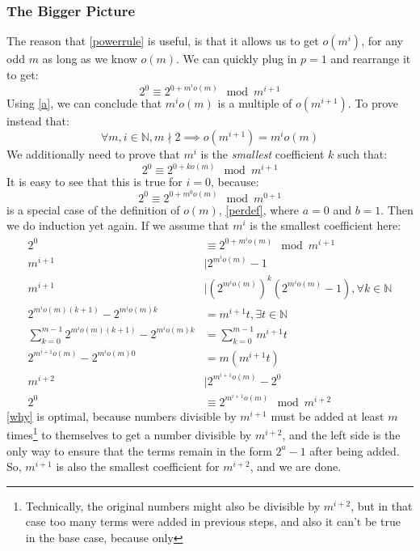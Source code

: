 \documentclass{article}
\begin{document}
  \subsubsection{The Bigger Picture}
  The reason that \eqref{powerrule} is useful, is that it allows us to get $o(m^i)$, for any odd $m$ as long as we know $o(m)$. We can quickly plug in $p = 1$ and rearrange it to get:
  \begin{equation}
    2^0 \equiv 2^{0+m^io(m)} \mod m^{i+1}
  \end{equation}
  Using \eqref{a}, we can conclude that $m^io(m)$ is a multiple of $o(m^{i+1})$. To prove instead that:
  \begin{equation}
    \forall m, i \in \mathbb{N}, m \nmid 2 \implies o(m^{i+1}) = m^io(m) 
  \end{equation}
  We additionally need to prove that $m^i$ is the \emph{smallest} coefficient $k$ such that:
  \begin{equation}
    2^0 \equiv 2^{0 + ko(m)} \mod m^{i+1}
  \end{equation}
  It is easy to see that this is true for $i=0$, because:
  \begin{equation}
    2^0 \equiv 2^{0 + m^0o(m)} \mod m^{0+1}
  \end{equation}
  is a special case of the definition of $o(m)$, \eqref{perdef}, where $a=0$ and $b=1$. Then we do induction yet again. If we assume that $m^i$ is the smallest coefficient here:
  \begin{align}
    2^0 &\equiv 2^{0 + m^io(m)} \mod m^{i+1}\\
    m^{i+1} &\mid 2^{m^io(m)} - 1 \\
    m^{i+1} &\mid (2^{m^io(m)})^k(2^{m^io(m)} - 1), \forall k \in \mathbb{N}\\
    2^{m^io(m)(k+1)} - 2^{m^io(m)k} &=  m^{i+1}t, \exists t \in \mathbb{N}\\
    \sum^{m-1}_{k=0}2^{m^io(m)(k+1)} - 2^{m^io(m)k} &= \sum^{m-1}_{k=0}m^{i+1}t\label{why}\\
    2^{m^{i+1}o(m)} - 2^{m^io(m)0} &= m(m^{i+1}t)\\
    m^{i+2} &\mid 2^{m^{i+1}o(m)} - 2^0\\
    2^0 &\equiv 2^{m^{i+1}o(m)} \mod m^{i+2}
  \end{align}
  \eqref{why} is optimal, because numbers divisible by $m^{i+1}$ must be added at least $m$ times\footnote{Technically, the original numbers might also be divisible by $m^{i+2}$, but in that case too many terms were added in previous steps, and also it can't be true in the base case, because only } to themselves to get a number divisible by $m^{i+2}$, and the left side is the only way to ensure that the terms remain in the form $2^a-1$ after being added. So, $m^{i+1}$ is also the smallest coefficient for $m^{i+2}$, and we are done.\\
  
\end{document}

